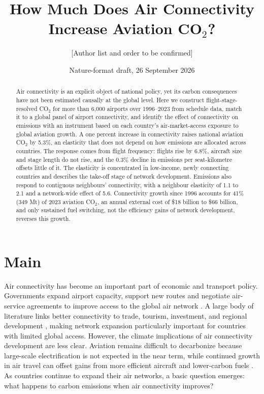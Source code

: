 \documentclass[12pt]{extarticle}
\title{How Much Does Air Connectivity Increase Aviation CO$_2$?}
\author{[Author list and order to be confirmed]}
\date{Nature-format draft, 26 September 2026}
\begin{document}
\maketitle

\begin{abstract}
\noindent Air connectivity is an explicit object of national policy, yet its
carbon consequences have not been estimated causally at the global level.
Here we construct flight-stage-resolved CO$_2$ for more than 6{,}000
airports over 1996--2023 from schedule data, match it to a global panel of
airport connectivity, and identify the effect of connectivity on emissions
with an instrument based on each country's air-market-access exposure to
global aviation growth. A one percent increase in
connectivity raises national aviation CO$_2$ by 5.3\%, an elasticity that does
not depend on how emissions are allocated across countries. The response comes from flight frequency: flights rise by
6.8\%, aircraft size and stage length do not rise, and the 0.3\% decline in
emissions per seat-kilometre offsets little of it. The elasticity is concentrated in low-income, newly connecting
countries and describes the take-off stage of network development.
Emissions also respond to contiguous neighbours' connectivity, with a
neighbour elasticity of 1.1 to 2.1 and a network-wide effect of 5.6.
Connectivity growth since 1996 accounts for 41\% (349 Mt) of 2023 aviation
CO$_2$, an annual external cost of \$18 billion to \$66 billion, and only
sustained fuel switching, not the efficiency gains of network development,
reverses this growth.
\end{abstract}

\section*{Main}
Air connectivity has become an important part of economic and transport
policy. Governments expand airport capacity, support new routes and
negotiate air-service agreements to improve access to the global air
network \citep{fageda2018,piermartini2013}. A large body of literature
links better connectivity to trade, tourism, investment, and regional
development \citep{lenaerts2021,zhang2020,amico2026}, making network expansion
particularly important for countries with limited global access. However,
the climate implications of air connectivity development are less clear.
Aviation remains difficult to decarbonize because large-scale
electrification is not expected in the near term, while continued growth
in air travel can offset gains from more efficient aircraft and
lower-carbon fuels \citep{bergero2023,sacchi2023}. As countries continue
to expand their air networks, a basic question emerges: what happens to
carbon emissions when air connectivity improves?
\end{document}
